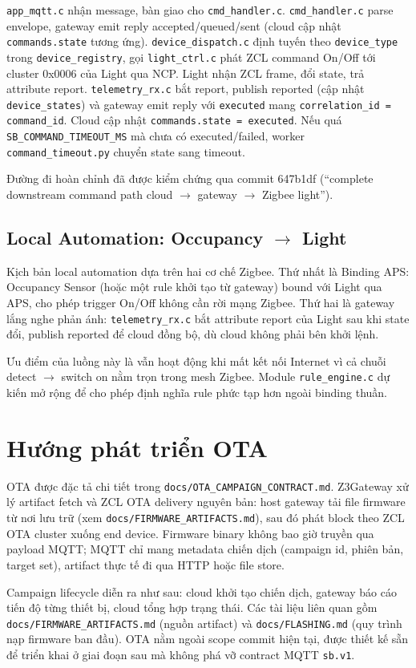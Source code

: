 \texttt{app\_mqtt.c} nhận message, bàn giao cho
\texttt{cmd\_handler.c}. \texttt{cmd\_handler.c} parse envelope,
gateway emit reply accepted/queued/sent (cloud cập nhật
\texttt{commands.state} tương ứng). \texttt{device\_dispatch.c} định
tuyến theo \texttt{device\_type} trong \texttt{device\_registry}, gọi
\texttt{light\_ctrl.c} phát ZCL command On/Off tới cluster 0x0006 của
Light qua NCP. Light nhận ZCL frame, đổi state, trả attribute report.
\texttt{telemetry\_rx.c} bắt report, publish reported (cập nhật
\texttt{device\_states}) và gateway emit reply với
\texttt{executed} mang \texttt{correlation\_id = command\_id}. Cloud
cập nhật \texttt{commands.state = executed}. Nếu quá
\texttt{SB\_COMMAND\_TIMEOUT\_MS} mà chưa có executed/failed, worker
\texttt{command\_timeout.py} chuyển state sang timeout.

Đường đi hoàn chỉnh đã được kiểm chứng qua commit 647b1df
(``complete downstream command path cloud $\rightarrow$ gateway
$\rightarrow$ Zigbee light'').

\subsection{Local Automation: Occupancy $\rightarrow$ Light}
\label{sec:ch3-local-automation}

Kịch bản local automation dựa trên hai cơ chế Zigbee. Thứ nhất là
Binding APS: Occupancy Sensor (hoặc một rule khởi tạo từ gateway)
bound với Light qua APS, cho phép trigger On/Off không cần rời mạng
Zigbee. Thứ hai là gateway lắng nghe phản ánh:
\texttt{telemetry\_rx.c} bắt attribute report của Light sau khi state
đổi, publish reported để cloud đồng bộ, dù cloud không phải bên khởi
lệnh.

Ưu điểm của luồng này là vẫn hoạt động khi mất kết nối Internet vì
cả chuỗi detect $\rightarrow$ switch on nằm trọn trong mesh Zigbee.
Module \texttt{rule\_engine.c} dự kiến mở rộng để cho phép định nghĩa
rule phức tạp hơn ngoài binding thuần.


\section{Hướng phát triển OTA}
\label{sec:ch3-ota}

OTA được đặc tả chi tiết trong \texttt{docs/OTA\_CAMPAIGN\_CONTRACT.md}.
Z3Gateway xử lý artifact fetch và ZCL OTA delivery nguyên bản: host
gateway tải file firmware từ nơi lưu trữ (xem
\texttt{docs/FIRMWARE\_ARTIFACTS.md}), sau đó phát block theo ZCL OTA
cluster xuống end device. Firmware binary không bao giờ truyền qua
payload MQTT; MQTT chỉ mang metadata chiến dịch (campaign id, phiên
bản, target set), artifact thực tế đi qua HTTP hoặc file store.

Campaign lifecycle diễn ra như sau: cloud khởi tạo chiến dịch, gateway
báo cáo tiến độ từng thiết bị, cloud tổng hợp trạng thái. Các tài
liệu liên quan gồm \texttt{docs/FIRMWARE\_ARTIFACTS.md} (nguồn
artifact) và \texttt{docs/FLASHING.md} (quy trình nạp firmware ban
đầu). OTA nằm ngoài scope commit hiện tại, được thiết kế sẵn để triển
khai ở giai đoạn sau mà không phá vỡ contract MQTT \texttt{sb.v1}.


\newpage
